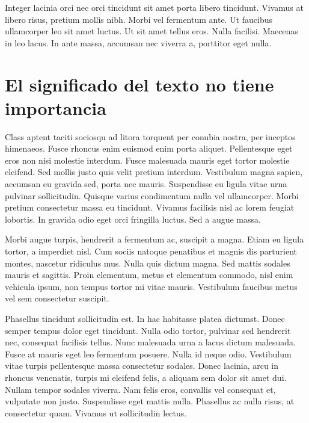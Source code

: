 \documentclass[11pt, a4paper]{report}
\begin{document}
Integer lacinia orci nec orci tincidunt sit amet porta libero tincidunt. Vivamus at libero risus, pretium mollis nibh. Morbi vel fermentum ante. Ut faucibus ullamcorper leo sit amet luctus. Ut sit amet tellus eros. Nulla facilisi. Maecenas in leo lacus. In ante massa, accumsan nec viverra a, porttitor eget nulla. 





\section[El título no importa]{El significado del texto no tiene importancia}


Class aptent taciti sociosqu ad litora torquent per conubia nostra, per inceptos himenaeos. Fusce rhoncus enim euismod enim porta aliquet. Pellentesque eget eros non nisi molestie interdum. Fusce malesuada mauris eget tortor molestie eleifend. Sed mollis justo quis velit pretium interdum. Vestibulum magna sapien, accumsan eu gravida sed, porta nec mauris. Suspendisse eu ligula vitae urna pulvinar sollicitudin. Quisque varius condimentum nulla vel ullamcorper. Morbi pretium consectetur massa eu tincidunt. Vivamus facilisis nisl ac lorem feugiat lobortis. In gravida odio eget orci fringilla luctus. Sed a augue massa.

Morbi augue turpis, hendrerit a fermentum ac, suscipit a magna. Etiam eu ligula tortor, a imperdiet nisl. Cum sociis natoque penatibus et magnis dis parturient montes, nascetur ridiculus mus. Nulla quis dictum magna. Sed mattis sodales mauris et sagittis. Proin elementum, metus et elementum commodo, nisl enim vehicula ipsum, non tempus tortor mi vitae mauris. Vestibulum faucibus metus vel sem consectetur suscipit.

Phasellus tincidunt sollicitudin est. In hac habitasse platea dictumst. Donec semper tempus dolor eget tincidunt. Nulla odio tortor, pulvinar sed hendrerit nec, consequat facilisis tellus. Nunc malesuada urna a lacus dictum malesuada. Fusce at mauris eget leo fermentum posuere. Nulla id neque odio. Vestibulum vitae turpis pellentesque massa consectetur sodales. Donec lacinia, arcu in rhoncus venenatis, turpis mi eleifend felis, a aliquam sem dolor sit amet dui. Nullam tempor sodales viverra. Nam felis eros, convallis vel consequat et, vulputate non justo. Suspendisse eget mattis nulla. Phasellus ac nulla risus, at consectetur quam. Vivamus ut sollicitudin lectus.
\end{document}
